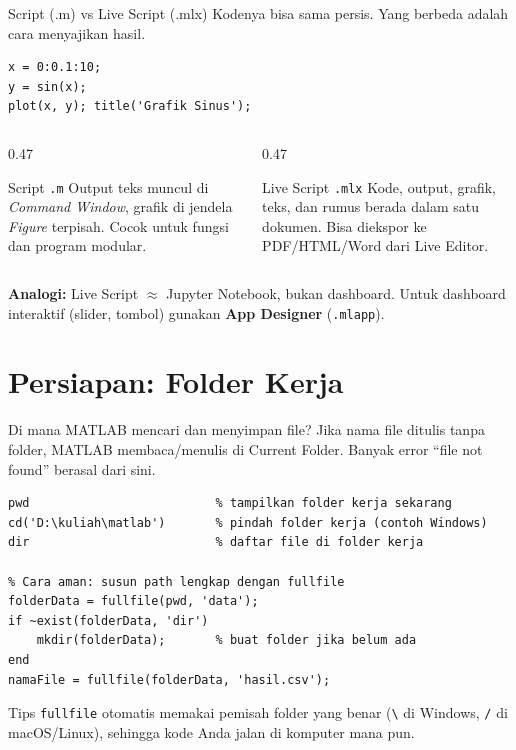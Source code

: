 \documentclass[10pt,aspectratio=169]{beamer}
\newcommand{\kode}[1]{\texttt{\small #1}}
\begin{document}
\begin{frame}[fragile]{Script (.m) vs Live Script (.mlx)}
  Kodenya \alert{bisa sama persis}. Yang berbeda adalah \alert{cara menyajikan hasil}.
  \vspace{0.3em}
\begin{lstlisting}
x = 0:0.1:10;
y = sin(x);
plot(x, y); title('Grafik Sinus');
\end{lstlisting}
  \begin{columns}[T]
    \begin{column}{0.47\textwidth}
      \begin{block}{Script \kode{.m}}
        \small Output teks muncul di \textit{Command Window}, grafik di jendela \textit{Figure} terpisah.
        Cocok untuk fungsi dan program modular.
      \end{block}
    \end{column}
    \begin{column}{0.47\textwidth}
      \begin{block}{Live Script \kode{.mlx}}
        \small Kode, output, grafik, teks, dan rumus berada dalam \alert{satu dokumen}.
        Bisa diekspor ke PDF/HTML/Word dari Live Editor.
      \end{block}
    \end{column}
  \end{columns}
  \vspace{0.4em}
  \footnotesize\textbf{Analogi:} Live Script $\approx$ \alert{Jupyter Notebook}, bukan dashboard.
  Untuk dashboard interaktif (slider, tombol) gunakan \textbf{App Designer} (\kode{.mlapp}).
\end{frame}

\section{Persiapan: Folder Kerja}

\begin{frame}[fragile]{Di mana MATLAB mencari dan menyimpan file?}
  Jika nama file ditulis \alert{tanpa folder}, MATLAB membaca/menulis di \alert{Current Folder}.
  Banyak error ``file not found'' berasal dari sini.
\begin{lstlisting}
pwd                          % tampilkan folder kerja sekarang
cd('D:\kuliah\matlab')       % pindah folder kerja (contoh Windows)
dir                          % daftar file di folder kerja

% Cara aman: susun path lengkap dengan fullfile
folderData = fullfile(pwd, 'data');
if ~exist(folderData, 'dir')
    mkdir(folderData);       % buat folder jika belum ada
end
namaFile = fullfile(folderData, 'hasil.csv');
\end{lstlisting}
  \begin{exampleblock}{Tips}
    \kode{fullfile} otomatis memakai pemisah folder yang benar (\kode{\textbackslash} di Windows, \kode{/} di macOS/Linux),
    sehingga kode Anda jalan di komputer mana pun.
  \end{exampleblock}
\end{frame}
\end{document}
